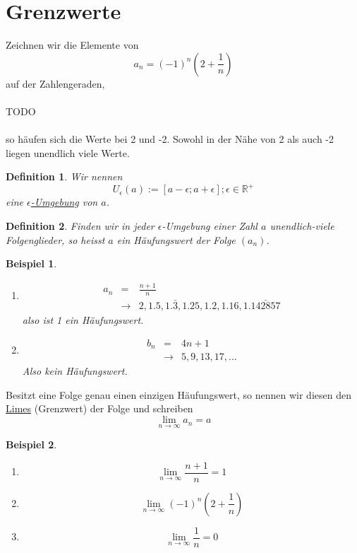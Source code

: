 \documentclass{report}
\newtheorem{mydef}{Definition}
\newtheorem{myexample}{Beispiel}
\begin{document}
\section{Grenzwerte}
Zeichnen wir die Elemente von
\begin{equation}a_n = (-1)^n(2+\frac{1}{n})\end{equation}
auf der Zahlengeraden,
\\\\TODO\\\\
so häufen sich die Werte bei 2 und -2. Sowohl in der Nähe von 2 als auch -2 liegen unendlich viele Werte.
\begin{mydef}Wir nennen
\begin{equation}U_\epsilon(a) := [a-\epsilon; a + \epsilon]; \epsilon \in \mathbb{R}^+\end{equation}
eine \underline{$\epsilon$-Umgebung} von $a$.\end{mydef}
\begin{mydef}Finden wir in jeder $\epsilon$-Umgebung einer Zahl $a$ unendlich-viele Folgenglieder, so heisst $a$ ein Häufungswert der Folge $(a_n)$.\end{mydef}
\begin{myexample}\begin{enumerate}
\item \begin{eqnarray}a_n & = & \frac{n+1}{n} \nonumber \\
& \rightarrow & 2, 1.5, 1.\bar{3}, 1.25, 1.2, 1.16, 1.\bar{142857}\end{eqnarray}
also ist 1 ein Häufungswert.
\item \begin{eqnarray}b_n & = & 4n + 1 \nonumber \\
& \rightarrow & 5, 9, 13, 17, ...\end{eqnarray}
Also kein Häufungswert.\end{enumerate}\end{myexample}
Besitzt eine Folge genau einen einzigen Häufungswert, so nennen wir diesen den \underline{Limes} (Grenzwert) der Folge und schreiben
\begin{equation}\lim_{n \to \infty}a_n = a \end{equation}
\begin{myexample}\begin{enumerate}
\item \begin{equation}\lim_{n \to \infty}\frac{n+1}{n}=1\end{equation}
\item \begin{equation}\lim_{n \to \infty}(-1)^n(2+\frac{1}{n})\end{equation}
\item \begin{equation}\lim_{n \to \infty}\frac{1}{n}=0\end{equation}
\end{enumerate}\end{myexample}
\end{document}
